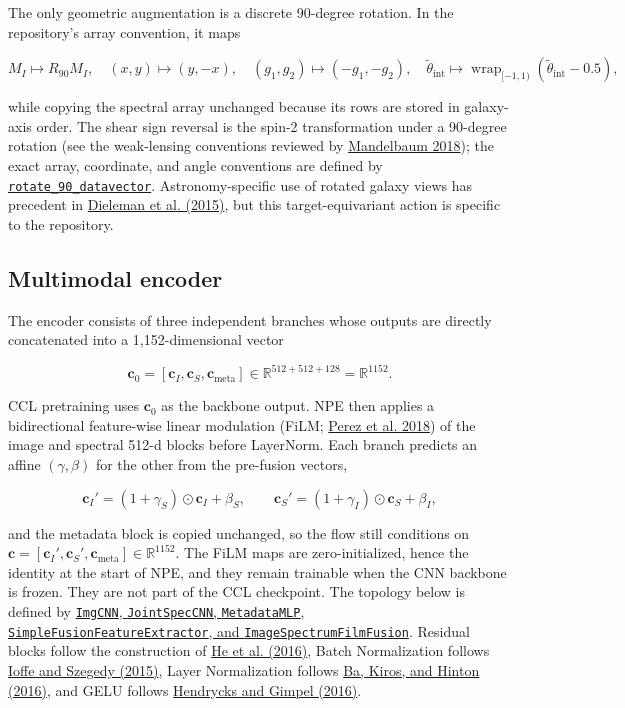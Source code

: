 \documentclass[11pt]{article}
\newcommand{\code}[1]{\nolinkurl{#1}}
\begin{document}
The only geometric augmentation is a discrete 90-degree rotation. In the
repository's array convention, it maps

\[
M_I\mapsto R_{90}M_I,\quad
(x,y)\mapsto(y,-x),\quad
(g_1,g_2)\mapsto(-g_1,-g_2),\quad
\widetilde{\theta}_\mathrm{int}
\mapsto\operatorname{wrap}_{[-1,1)}(\widetilde{\theta}_\mathrm{int}-0.5),
\]

while copying the spectral array unchanged because its rows are stored in
galaxy-axis order. The shear sign reversal is the spin-2 transformation under
a 90-degree rotation (see the weak-lensing conventions reviewed by \hyperlink{ref:mandelbaum2018}{Mandelbaum 2018}); the exact array, coordinate, and angle conventions are
defined by \href{../arch/data.py}{\code{rotate_90_datavector}}. Astronomy-specific use of
rotated galaxy views has precedent in \hyperlink{ref:dieleman2015}{Dieleman et al. (2015)},
but this target-equivariant action is specific to the repository.

\subsection{Multimodal encoder}

The encoder consists of three independent branches whose outputs are directly
concatenated into a 1,152-dimensional vector

\[
\mathbf c_0=
[\mathbf c_I,\mathbf c_S,\mathbf c_\mathrm{meta}]
\in\mathbb R^{512+512+128}=\mathbb R^{1152}.
\]

CCL pretraining uses \(\mathbf c_0\) as the backbone output. NPE then applies a
bidirectional feature-wise linear modulation (FiLM; \hyperlink{ref:perez2018}{Perez et al. 2018})
of the image and spectral 512-d blocks before LayerNorm. Each branch predicts
an affine \((\gamma,\beta)\) for the other from the pre-fusion vectors,

\[
\mathbf c_I'=(1+\gamma_S)\odot\mathbf c_I+\beta_S,\qquad
\mathbf c_S'=(1+\gamma_I)\odot\mathbf c_S+\beta_I,
\]

and the metadata block is copied unchanged, so the flow still conditions on
\(\mathbf c=[\mathbf c_I',\mathbf c_S',\mathbf c_\mathrm{meta}]\in\mathbb R^{1152}\).
The FiLM maps are zero-initialized, hence the identity at the start of NPE, and
they remain trainable when the CNN backbone is frozen. They are not part of the
CCL checkpoint. The topology below is defined by \href{../arch/networks.py}{\code{ImgCNN}, \code{JointSpecCNN}, \code{MetadataMLP}, \code{SimpleFusionFeatureExtractor}, and \code{ImageSpectrumFilmFusion}}. Residual blocks follow
the construction of \hyperlink{ref:he2016}{He et al. (2016)}, Batch Normalization follows
\hyperlink{ref:ioffe2015}{Ioffe and Szegedy (2015)}, Layer Normalization follows \hyperlink{ref:ba2016}{Ba, Kiros, and Hinton (2016)}, and GELU follows \hyperlink{ref:hendrycks2016}{Hendrycks and Gimpel (2016)}.
\end{document}
